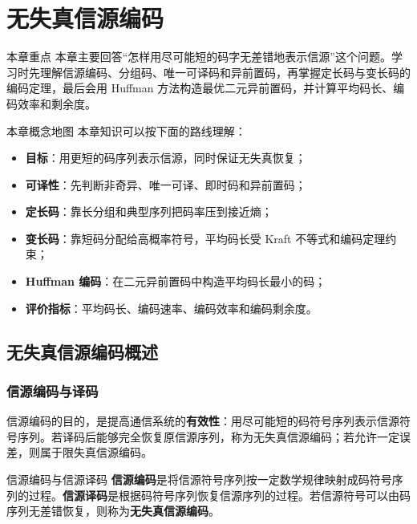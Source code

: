 \section{无失真信源编码}

\begin{remarkBox}{本章重点}
本章主要回答“怎样用尽可能短的码字无差错地表示信源”这个问题。学习时先理解信源编码、分组码、唯一可译码和异前置码，再掌握定长码与变长码的编码定理，最后会用 Huffman 方法构造最优二元异前置码，并计算平均码长、编码效率和剩余度。
\end{remarkBox}

\begin{keypoint}{本章概念地图}
本章知识可以按下面的路线理解：
\begin{itemize}
  \item \textbf{目标}：用更短的码序列表示信源，同时保证无失真恢复；
  \item \textbf{可译性}：先判断非奇异、唯一可译、即时码和异前置码；
  \item \textbf{定长码}：靠长分组和典型序列把码率压到接近熵；
  \item \textbf{变长码}：靠短码分配给高概率符号，平均码长受 Kraft 不等式和编码定理约束；
  \item \textbf{Huffman 编码}：在二元异前置码中构造平均码长最小的码；
  \item \textbf{评价指标}：平均码长、编码速率、编码效率和编码剩余度。
\end{itemize}
\end{keypoint}

\subsection{无失真信源编码概述}

\subsubsection{信源编码与译码}
信源编码的目的，是提高通信系统的\textbf{有效性}：用尽可能短的码符号序列表示信源符号序列。若译码后能够完全恢复原信源序列，称为无失真信源编码；若允许一定误差，则属于限失真信源编码。

\begin{definitionBox}{信源编码与信源译码}
\textbf{信源编码}是将信源符号序列按一定数学规律映射成码符号序列的过程。\textbf{信源译码}是根据码符号序列恢复信源序列的过程。若信源符号可以由码序列无差错恢复，则称为\textbf{无失真信源编码}。
\end{definitionBox}

